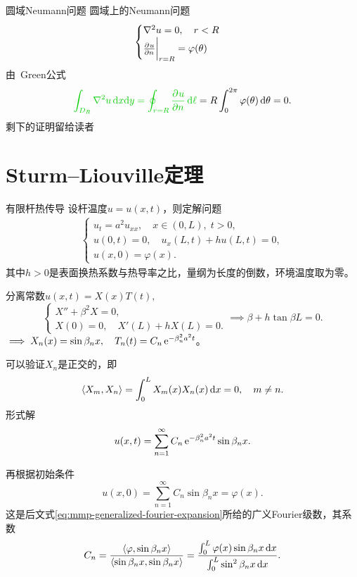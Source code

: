 \begin{example}{圆域Neumann问题}{}
	圆域上的Neumann问题
	\begin{align*}
		\begin{cases}
			\nabla^2 u = 0,\quad r < R\\
			{\frac{\partial^{}u}{\partial{n}^{}}}\biggr\rvert_{r=R} = \varphi(\theta)
		\end{cases}
	\end{align*}
	由~\textcolor[rgb]{0,.8,0}{Green公式}
	\begin{align*}
		{\color[rgb]{0,.8,0}{\int_{D_R}\laplacian u\d x\nd y = \oint_{r=R}\pv un\d\ell}} = R\int_0^{2\pi}\varphi(\theta)\d\theta = 0.
	\end{align*}
	剩下的证明留给读者
\end{example}

\section{Sturm--Liouville定理}
\begin{example}{有限杆热传导}{}
	设杆温度$u = u(x,t)$，则定解问题
	\begin{align*}
		\begin{cases}
			u_t = a^2u_{xx},\quad x \in (0,L),\;t > 0,\\
			u(0,t) = 0,\quad u_x(L,t) + hu(L,t) = 0,\\
			u(x,0) = \varphi(x).
		\end{cases}
	\end{align*}
	其中$h > 0$是表面换热系数与热导率之比，量纲为长度的倒数，环境温度取为零。
	
	分离常数$u(x,t) = X(x)T(t),$
	\begin{equation}
		\label{eq:mmp-mixed-rod-eigenproblem}
		\begin{cases}
			X'' + \beta^2X = 0, \\
			X(0) = 0,\quad X'(L) + hX(L) = 0.
		\end{cases} \implies \beta + h\tan\beta L = 0.
	\end{equation}
	$\implies X_n(x) = \sin\beta_nx,\quad T_n(t) = C_n\mathop{}\!\mathrm{e}^{-\beta_n^2a^2t}$。
	
	可以验证$X_n$是正交的，即
	\[
		\langle X_m,X_n\rangle = \int_0^LX_m(x)X_n(x)\mathop{}\!\mathrm{d} x = 0,\quad m \neq n.
	\]
	形式解
	\begin{equation}
		\label{eq:mmp-mixed-rod-heat-series}
		u(x,t) = \sum_{n=1}^\infty C_n\mathop{}\!\mathrm{e}^{-\beta_n^2a^2t}\sin\beta_nx.
	\end{equation}
	
	再根据初始条件
	\[
		u(x,0) = \sum_{n=1}^\infty C_n\sin\beta_nx = \varphi(x).
	\]
	这是后文式\eqref{eq:mmp-generalized-fourier-expansion}所给的广义Fourier级数，其系数
	\[
		C_n = \frac{\langle\varphi,\sin\beta_nx\rangle}{\langle\sin\beta_nx,\sin\beta_nx\rangle} = \frac{\int_0^L\varphi(x)\sin\beta_nx\mathop{}\!\mathrm{d} x}{\int_0^L\sin^2\beta_nx\mathop{}\!\mathrm{d} x}.
	\]
\end{example}
